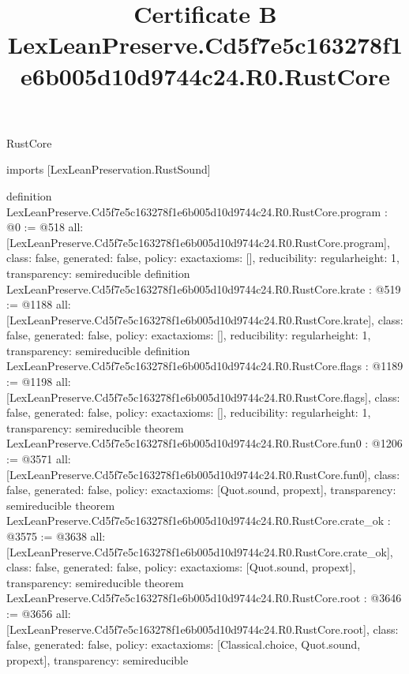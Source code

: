 \begin{lexlean}{RustCore}
\title{Certificate B LexLeanPreserve.Cd5f7e5c163278f1e6b005d10d9744c24.R0.RustCore}
\begin{coremodule}
imports [LexLeanPreservation.RustSound]

definition LexLeanPreserve.Cd5f7e5c163278f1e6b005d10d9744c24.R0.RustCore.program : @0 := @518 {
  all: [LexLeanPreserve.Cd5f7e5c163278f1e6b005d10d9744c24.R0.RustCore.program],
  class: false,
  generated: false,
  policy: exact{axioms: []},
  reducibility: regular{height: 1},
  transparency: semireducible
}
definition LexLeanPreserve.Cd5f7e5c163278f1e6b005d10d9744c24.R0.RustCore.krate : @519 := @1188 {
  all: [LexLeanPreserve.Cd5f7e5c163278f1e6b005d10d9744c24.R0.RustCore.krate],
  class: false,
  generated: false,
  policy: exact{axioms: []},
  reducibility: regular{height: 1},
  transparency: semireducible
}
definition LexLeanPreserve.Cd5f7e5c163278f1e6b005d10d9744c24.R0.RustCore.flags : @1189 := @1198 {
  all: [LexLeanPreserve.Cd5f7e5c163278f1e6b005d10d9744c24.R0.RustCore.flags],
  class: false,
  generated: false,
  policy: exact{axioms: []},
  reducibility: regular{height: 1},
  transparency: semireducible
}
theorem LexLeanPreserve.Cd5f7e5c163278f1e6b005d10d9744c24.R0.RustCore.fun0 : @1206 := @3571 {
  all: [LexLeanPreserve.Cd5f7e5c163278f1e6b005d10d9744c24.R0.RustCore.fun0],
  class: false,
  generated: false,
  policy: exact{axioms: [Quot.sound, propext]},
  transparency: semireducible
}
theorem LexLeanPreserve.Cd5f7e5c163278f1e6b005d10d9744c24.R0.RustCore.crate_ok : @3575 := @3638 {
  all: [LexLeanPreserve.Cd5f7e5c163278f1e6b005d10d9744c24.R0.RustCore.crate_ok],
  class: false,
  generated: false,
  policy: exact{axioms: [Quot.sound, propext]},
  transparency: semireducible
}
theorem LexLeanPreserve.Cd5f7e5c163278f1e6b005d10d9744c24.R0.RustCore.root : @3646 := @3656 {
  all: [LexLeanPreserve.Cd5f7e5c163278f1e6b005d10d9744c24.R0.RustCore.root],
  class: false,
  generated: false,
  policy: exact{axioms: [Classical.choice, Quot.sound, propext]},
  transparency: semireducible
}


\end{coremodule}
\end{lexlean}
